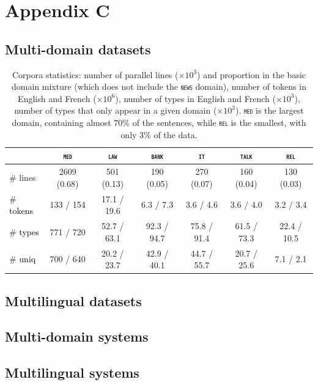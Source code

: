 \documentclass[11pt]{article}
\newcommand{\revisiondone}[1]{\textcolor{black}{#1}}
\newcommand{\domain}[1]{\texttt{\textsc{#1}}}
\begin{document}
\section{Appendix C}
\label{appendix:c}
\subsection{Multi-domain datasets}

\begin{table}[h!]
  \centering
  \begin{tabular}{|l|cccccc|} %
    \cline{2-7} 
    \multicolumn{1}{c|}{} & \multicolumn{1}{c}{\domain{med}} & \multicolumn{1}{c}{\domain{law}} & \multicolumn{1}{c}{\domain{bank}} & \multicolumn{1}{c}{\domain{it}} & \multicolumn{1}{c}{\domain{talk}} & \multicolumn{1}{c}{\domain{rel}} \\
    \hline 
    \# lines & 2609 (0.68) & 501 (0.13) & 190 (0.05) & 270 (0.07) & 160 (0.04) & 130 (0.03) \\
    \# \revisiondone{tokens}  &  133 / 154  &  17.1 / 19.6 &  6.3 / 7.3 &  3.6 / 4.6 &  3.6 / 4.0 &  3.2 / 3.4 \\
    \# \revisiondone{types}  & 771 / 720 & 52.7 / 63.1 & 92.3 / 94.7 & 75.8 / 91.4 & 61.5 / 73.3 & 22.4 / 10.5 \\
    \# \revisiondone{uniq} & 700 / 640 & 20.2 / 23.7 & 42.9 / 40.1 & 44.7 / 55.7 & 20.7 / 25.6 & 7.1 / 2.1 \\
    \hline
  \end{tabular}
  \caption{Corpora statistics: number of parallel lines ($\times 10^3$) and proportion in the basic domain mixture (which does not include the \domain{news} domain), number of tokens in English and French ($\times 10^6$), number of types in English and French ($\times 10^3$), number of types that only appear in a given domain ($\times 10^3$). \domain{med} is the largest domain, containing almost 70\% of the sentences, while \domain{rel} is the smallest, with only 3\% of the data.
  }
\label{tab:Corpora-chap4}
\end{table}

\subsection{Multilingual datasets}

\subsection{Multi-domain systems}

\subsection{Multilingual systems}
\end{document}
